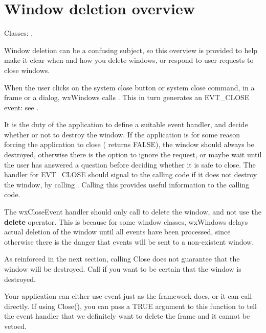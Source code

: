\section{Window deletion overview}\label{windowdeletionoverview}

Classes: , 

Window deletion can be a confusing subject, so this overview is provided
to help make it clear when and how you delete windows, or respond to user requests
to close windows.


When the user clicks on the system close button or system close command,
in a frame or a dialog, wxWindows calls . This
in turn generates an EVT\_CLOSE event: see .

It is the duty of the application to define a suitable event handler, and
decide whether or not to destroy the window.
If the application is for some reason forcing the application to close
( returns FALSE), the window should always be destroyed, otherwise there is the option to
ignore the request, or maybe wait until the user has answered a question
before deciding whether it is safe to close. The handler for EVT\_CLOSE should
signal to the calling code if it does not destroy the window, by calling 
. Calling this provides useful information
to the calling code.

The wxCloseEvent handler should only call  to
delete the window, and not use the {\bf delete} operator. This is because
for some window classes, wxWindows delays actual deletion of the window until all events have been processed,
since otherwise there is the danger that events will be sent to a non-existent window.

As reinforced in the next section, calling Close does not guarantee that the window
will be destroyed. Call  if you want to be
certain that the window is destroyed.


Your application can either use  event just as
the framework does, or it can call  directly.
If using Close(), you can pass a TRUE argument to this function to tell the event handler
that we definitely want to delete the frame and it cannot be vetoed.

